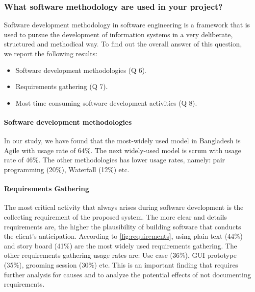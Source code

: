 \subsubsection{What software methodology are used in your project?}
\label{methodology}
Software development methodology in software engineering is a framework that is used to pursue the development of information systems in a very deliberate, structured and methodical way. To find out the overall answer of this question, we report the following results:
\begin{itemize}
\item Software development methodologies (Q 6).
\item Requirements gathering (Q 7).
\item Most time consuming software development activities (Q 8).
\end{itemize}

\paragraph{Software development methodologies}
In our study, we have found that the most-widely used model in Bangladesh is Agile with usage rate of 64\%. The next widely-used model is scrum with usage rate of 46\%. The other methodologies has lower usage rates, namely: pair programming (20\%), Waterfall (12\%) etc.


\paragraph{Requirements Gathering}
The most critical activity that always arises during software development is the collecting requirement of the proposed system. The more clear and details requirements are, the higher the plausibility of building software that conducts the client’s anticipation. According to \ref{fig:requirements}, using plain text (44\%) and story board (41\%) are the most widely used requirements gathering. The other requirements gathering usage rates are: Use case (36\%), GUI prototype (35\%), grooming session (30\%) etc. This is an important finding that requires further analysis for causes and to analyze the potential effects of not documenting requirements.

